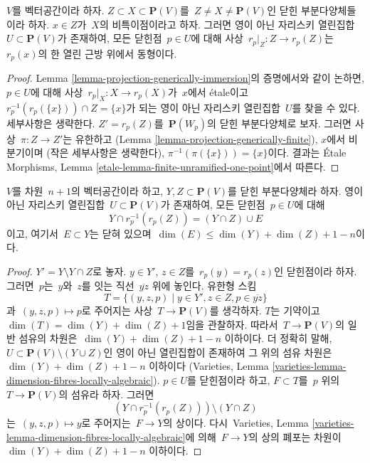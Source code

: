 \begin{lemma}
\label{lemma-projection-generically-immersion-refined}
$V$를 벡터공간이라 하자.
$Z \subset X \subset \mathbf{P}(V)$를\ 
$Z \not = X \not = \mathbf{P}(V)$인 닫힌 부분다양체들이라 하자.
$x \in Z$가\  $X$의 비특이점이라고 하자. 그러면 영이 아닌 자리스키 열린집합\ 
$U \subset \mathbf{P}(V)$가 존재하여, 모든 닫힌점\  $p \in U$에 대해
사상\  $r_p|_Z : Z \to r_p(Z)$는\  $r_p(x)$의 한 열린 근방 위에서 동형이다.
\end{lemma}

\begin{proof}
Lemma \ref{lemma-projection-generically-immersion}의 증명에서와 같이 논하면,
$p \in U$에 대해 사상\  $r_p|_X : X \to r_p(X)$가\  $x$에서 \'etale이고\ 
$r_p^{-1}(r_p(\{x\})) \cap Z = \{x\}$가 되는 영이 아닌 자리스키
열린집합\  $U$를 찾을 수 있다. 세부사항은 생략한다.
$Z' = r_p(Z)$를\  $\mathbf{P}(W_p)$의 닫힌 부분다양체로 보자.
그러면 사상\  $\pi : Z \to Z'$는 유한하고
(Lemma \ref{lemma-projection-generically-finite}), $x$에서 비분기이며
(작은 세부사항은 생략한다), $\pi^{-1}(\pi(\{x\})) = \{x\}$이다.
결과는 \'Etale Morphisms, Lemma
\ref{etale-lemma-finite-unramified-one-point}에서 따른다.
\end{proof}

\begin{lemma}
\label{lemma-projection-injective}
$V$를 차원\  $n + 1$의 벡터공간이라 하고,
$Y, Z \subset \mathbf{P}(V)$를 닫힌 부분다양체라 하자.
영이 아닌 자리스키 열린집합\  $U \subset \mathbf{P}(V)$가 존재하여,
모든 닫힌점\  $p \in U$에 대해
$$
Y \cap r_p^{-1}(r_p(Z)) = (Y \cap Z) \cup E
$$
이고, 여기서\  $E \subset Y$는 닫혀 있으며\ 
$\dim(E) \leq \dim(Y) + \dim(Z) + 1 - n$이다.
\end{lemma}

\begin{proof}
$Y' = Y \setminus Y \cap Z$로 놓자. $y \in Y'$, $z \in Z$를\ 
$r_p(y) = r_p(z)$인 닫힌점이라 하자. 그러면\  $p$는\  $y$와\  $z$를 잇는 직선\ 
$\overline{yz}$ 위에 놓인다. 유한형 스킴
$$
T = \{(y, z, p) \mid y \in Y', z \in Z, p \in \overline{yz}\}
$$
과\  $(y, z, p) \mapsto p$로 주어지는 사상\ 
$T \to \mathbf{P}(V)$를 생각하자. $T$는 기약이고\ 
$\dim(T) = \dim(Y) + \dim(Z) + 1$임을 관찰하자. 따라서\ 
$T \to \mathbf{P}(V)$의 일반 섬유의 차원은\ 
$\dim(Y) + \dim(Z) + 1 - n$ 이하이다. 더 정확히 말해,
$U \subset \mathbf{P}(V) \setminus (Y \cup Z)$인 영이 아닌 열린집합이 존재하여
그 위의 섬유 차원은\  $\dim(Y) + \dim(Z) + 1 - n$ 이하이다
(Varieties, Lemma \ref{varieties-lemma-dimension-fibres-locally-algebraic}).
$p \in U$를 닫힌점이라 하고, $F \subset T$를\  $p$ 위의\ 
$T \to \mathbf{P}(V)$의 섬유라 하자. 그러면
$$
(Y \cap r_p^{-1}(r_p(Z))) \setminus (Y \cap Z)
$$
는\  $(y, z, p) \mapsto y$로 주어지는\  $F \to Y$의 상이다.
다시\  Varieties, Lemma
\ref{varieties-lemma-dimension-fibres-locally-algebraic}에 의해\  $F \to Y$의
상의 폐포는 차원이\  $\dim(Y) + \dim(Z) + 1 - n$ 이하이다.
\end{proof}

